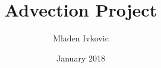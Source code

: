 




\title{Advection Project}


\author[M. Ivkovic]{Mladen Ivkovic}
\date{January 2018}











% 
% 
% 
% 
% 







